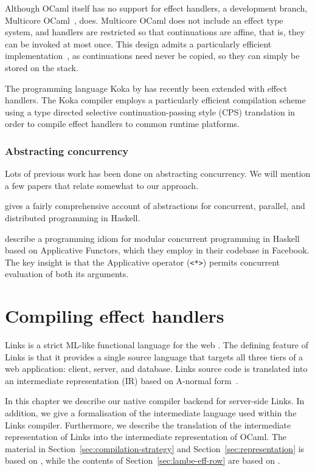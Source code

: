 \documentclass[12pt,mscres,cdtppar,twoside,openright,logo,rightchapter,normalheadings]{infthesis}
\theoremstyle{definition}
\newcommand{\todo}[1]{{\par\noindent\small\color{red} \framebox{\parbox{\dimexpr\linewidth-2\fboxsep-2\fboxrule}{\textbf{TODO:} #1}}}}
\begin{document}
Although OCaml itself has no support for effect handlers, a
development branch, Multicore OCaml~\citep{Dolan2015}, does. Multicore
OCaml does not include an effect type system, and handlers are
restricted so that continuations are affine, that is, they can be
invoked at most once. This design admits a particularly efficient
implementation~\citep{Bruggeman1996}, as continuations need never be
copied, so they can simply be stored on the stack.

The programming language Koka by \citet{Leijen2016} has recently
been extended with effect handlers. The Koka compiler employs a
particularly efficient compilation scheme using a type directed
selective continuation-passing style (CPS) translation in order to
compile effect handlers to common runtime platforms.

\subsection{Abstracting concurrency}
Lots of previous work has been done on abstracting concurrency. We
will mention a few papers that relate somewhat to our approach.

\cite{Marlow2013} gives a fairly comprehensive account of abstractions
for concurrent, parallel, and distributed programming in Haskell.
\todo{Finish this section}

\cite{Marlow2014} describe a programming idiom for modular concurrent
programming in Haskell based on Applicative Functors, which they
employ in their codebase in Facebook.  The key insight is that the
Applicative operator (\lstinline$<*>$) permits concurrent evaluation
of both its arguments. 


\chapter{Compiling effect handlers}
\label{ch:compiling}

Links is a strict ML-like functional language for the web
\citep{Cooper2006}. The defining feature of Links is that it provides
a single source language that targets all three tiers of a web
application: client, server, and database. Links source code is
translated into an intermediate representation (IR) based on A-normal
form~\citep{Flanagan1993}.

In this chapter we describe our native compiler backend for
server-side Links. In addition, we give a formalisation of the
intermediate language used within the Links compiler. Furthermore, we
describe the translation of the intermediate representation of Links
into the intermediate representation of OCaml. The material in
Section~\ref{sec:compilation-strategy} and
Section~\ref{sec:representation} is based on \cite{Hillerstrom2016b},
while the contents of Section~\ref{sec:lambe-eff-row} are based on
\cite{Hillerstrom2016a}.
\end{document}
